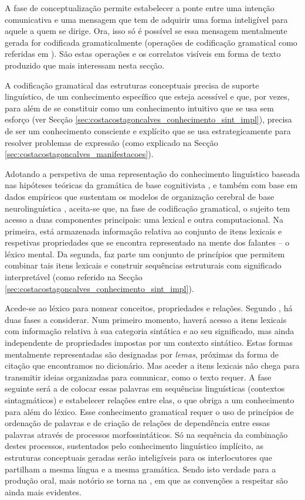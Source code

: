 \documentclass[output=paper]{LSP/langsci}
\begin{document}
A fase de conceptualização permite estabelecer a ponte entre uma intenção comunicativa e uma mensagem que tem de adquirir uma forma inteligível para aquele a quem se dirige. Ora, isso só é possível se essa mensagem mentalmente gerada for codificada gramaticalmente (operações de codificação gramatical como referidas em \citealt{bocklevelt2002}). São estas operações e os correlatos visíveis em forma de texto produzido que mais interessam nesta secção. 

A codificação gramatical das estruturas conceptuais precisa de suporte linguístico, de um conhecimento específico que esteja acessível e que, por vezes, para além de se constituir como um conhecimento intuitivo que se usa sem esforço (ver Secção \ref{sec:costacostagoncalves_conhecimento_sint_impl}), precisa de ser um conhecimento consciente e explícito que se usa estrategicamente para resolver problemas de expressão (como explicado na Secção \ref{sec:costacostagoncalves_manifestacoes}).

Adotando a perspetiva de uma representação do conhecimento linguístico baseada nas hipóteses teóricas da gramática de base cognitivista \citep{chomsky1986}, e também com base em dados empíricos que sustentam os modelos de organização cerebral de base neurolinguística \citep{ullman2001}, aceita-se que, na fase de codificação gramatical, o sujeito tem acesso a duas componentes principais: uma lexical e outra computacional. Na primeira, está armazenada informação relativa ao conjunto de itens lexicais e respetivas propriedades que se encontra representado na mente dos falantes – o léxico mental. Da segunda, faz parte um conjunto de princípios que permitem combinar tais itens lexicais e construir sequências estruturais com significado interpretável (como referido na Secção \ref{sec:costacostagoncalves_conhecimento_sint_impl}).

\largerpage Acede-se ao léxico para nomear conceitos, propriedades e relações. Segundo \citet{levelt1989}, há duas fases a considerar. Num primeiro momento, haverá acesso a itens lexicais com informação relativa à sua categoria sintática e ao seu significado, mas ainda independente de propriedades impostas por um contexto sintático. Estas formas mentalmente representadas são designadas por \textit{lemas}, próximas da forma de citação que encontramos no dicionário. Mas aceder a itens lexicais não chega para transmitir ideias organizadas para comunicar, como o texto requer. A fase seguinte será a de colocar essas palavras em sequências linguísticas (contextos sintagmáticos) e estabelecer relações entre elas, o que obriga a um conhecimento para além do léxico. Esse conhecimento gramatical requer o uso de princípios de ordenação de palavras e de criação de relações de dependência entre essas palavras através de processos morfossintáticos. Só na sequência da combinação destes processos, sustentados pelo conhecimento linguístico implícito, as estruturas conceptuais geradas serão inteligíveis para os interlocutores que partilham a mesma língua e a mesma gramática. Sendo isto verdade para a produção oral, mais notório se torna na , em que as convenções a respeitar são ainda mais evidentes. 
\end{document}
